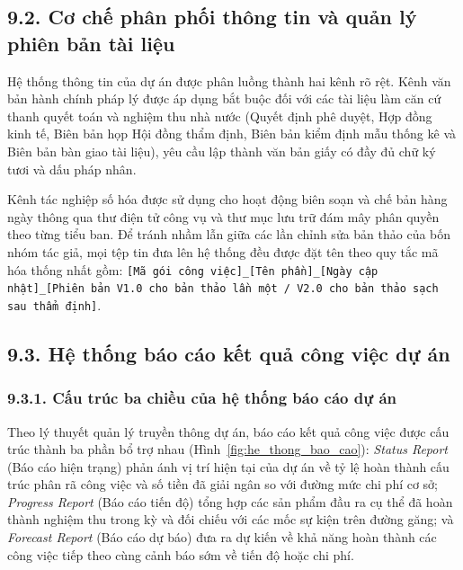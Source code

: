 \subsection{9.2. Cơ chế phân phối thông tin và quản lý phiên bản tài liệu}

Hệ thống thông tin của dự án được phân luồng thành hai kênh rõ rệt. Kênh văn bản hành chính pháp lý được áp dụng bắt buộc đối với các tài liệu làm căn cứ thanh quyết toán và nghiệm thu nhà nước (Quyết định phê duyệt, Hợp đồng kinh tế, Biên bản họp Hội đồng thẩm định, Biên bản kiểm định mẫu thống kê và Biên bản bàn giao tài liệu), yêu cầu lập thành văn bản giấy có đầy đủ chữ ký tươi và dấu pháp nhân.

Kênh tác nghiệp số hóa được sử dụng cho hoạt động biên soạn và chế bản hàng ngày thông qua thư điện tử công vụ và thư mục lưu trữ đám mây phân quyền theo từng tiểu ban. Để tránh nhầm lẫn giữa các lần chỉnh sửa bản thảo của bốn nhóm tác giả, mọi tệp tin đưa lên hệ thống đều được đặt tên theo quy tắc mã hóa thống nhất gồm: \texttt{[Mã gói công việc]\_[Tên phần]\_[Ngày cập nhật]\_[Phiên bản V1.0 cho bản thảo lần một / V2.0 cho bản thảo sạch sau thẩm định]}.

\subsection{9.3. Hệ thống báo cáo kết quả công việc dự án}

\subsubsection{9.3.1. Cấu trúc ba chiều của hệ thống báo cáo dự án}

Theo lý thuyết quản lý truyền thông dự án, báo cáo kết quả công việc được cấu trúc thành ba phần bổ trợ nhau (Hình~\ref{fig:he_thong_bao_cao}): \textit{Status Report} (Báo cáo hiện trạng) phản ánh vị trí hiện tại của dự án về tỷ lệ hoàn thành cấu trúc phân rã công việc và số tiền đã giải ngân so với đường mức chi phí cơ sở; \textit{Progress Report} (Báo cáo tiến độ) tổng hợp các sản phẩm đầu ra cụ thể đã hoàn thành nghiệm thu trong kỳ và đối chiếu với các mốc sự kiện trên đường găng; và \textit{Forecast Report} (Báo cáo dự báo) đưa ra dự kiến về khả năng hoàn thành các công việc tiếp theo cùng cảnh báo sớm về tiến độ hoặc chi phí.

